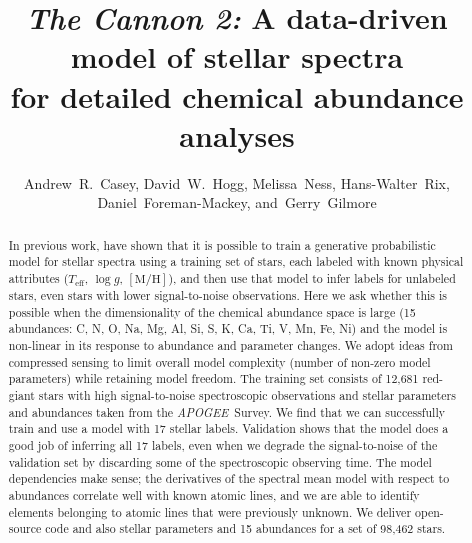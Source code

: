 \documentclass[12pt,preprint]{aastex}
\newcommand{\project}[1]{\textsl{#1}}
\newcommand{\acronym}[1]{{\small{#1}}}
\newcommand{\apogee}{\project{\acronym{APOGEE}}}
\newcommand{\logg}{\log g}
\newcommand{\mh}{\mathrm{[M/H]}}
\newcommand{\Teff}{T_{\mathrm{eff}}}
\begin{document}
\title{\textsl{The Cannon 2:} A data-driven model of stellar spectra \\
       for detailed chemical abundance analyses}
\author{Andrew~R.~Casey,
		David~W.~Hogg,
		Melissa~Ness,
		Hans-Walter~Rix,
		Daniel~Foreman-Mackey,
	and~Gerry~Gilmore}


\begin{abstract}
In previous work, \citet{tc} have shown that it is possible to train a generative
probabilistic model for stellar spectra using a training set of stars, each labeled with known
physical attributes ($\Teff$, $\logg$, $\mh$), and then use that model to infer labels for
unlabeled stars, even stars with lower signal-to-noise observations.
Here we ask whether this is possible when the dimensionality of the chemical
abundance space is large
(15 abundances: C, N, O, Na, Mg, Al, Si, S, K, Ca, Ti, V, Mn, Fe, Ni)
and the model is non-linear in its response to abundance and parameter changes.
We adopt ideas from compressed sensing to limit overall model complexity (number
of non-zero model parameters) while retaining model freedom.
The training set consists of 12,681 red-giant stars with high signal-to-noise
spectroscopic observations and stellar parameters and abundances taken from the
\apogee\ Survey.
We find that we can successfully train and use a model with 17 stellar labels.
Validation shows that the model does a good job of inferring all 17 labels,
even when we degrade the signal-to-noise of the
validation set by discarding some of the spectroscopic observing time.
The model dependencies make sense; the derivatives of the spectral mean model
with respect to abundances correlate well with known atomic lines, and we are
able to identify elements belonging to atomic lines that were previously unknown.
We deliver open-source code and also stellar parameters and 15 abundances for a
set of 98,462 stars.
\end{abstract}
\end{document}
